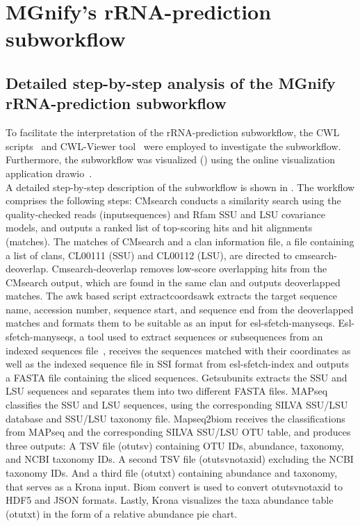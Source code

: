 \section{MGnify's rRNA-prediction subworkflow}\label{sec:Ported-version-of-MGnify}

\subsection{Detailed step-by-step analysis of the MGnify rRNA-prediction subworkflow}\label{subsec:Interpretation}
To facilitate the interpretation of the rRNA-prediction subworkflow, the CWL scripts~\cite{noauthor_pipeline-v5_2023} and CWL-Viewer tool~\cite{noauthor_common_nodate} were employed to investigate the subworkflow. Furthermore, the subworkflow was visualized () using the online visualization application drawio~\cite{noauthor_jgraphdrawio_nodate}.\\
A detailed step-by-step description of the subworkflow is shown in . The workflow comprises the following steps: CMsearch conducts a similarity search using the quality-checked reads (input\textunderscore sequences) and Rfam SSU and LSU covariance models, and outputs a ranked list of top-scoring hits and hit alignments (matches). The matches of CMsearch and a clan information file, a file containing a list of clans, CL00111 (SSU) and CL00112 (LSU), are directed to cmsearch-deoverlap. Cmsearch-deoverlap removes low-score overlapping hits from the CMsearch output, which are found in the same clan and outputs deoverlapped matches. The awk based script extract\textunderscore coords\textunderscore awk extracts the target sequence name, accession number, sequence start, and sequence end from the deoverlapped matches and formats them to be suitable as an input for esl-sfetch-manyseqs. Esl-sfetch-manyseqs, a tool used to extract sequences or subsequences from an indexed sequences file~\cite{eddy_hmmer_nodate},  receives the sequences matched with their coordinates as well as the indexed sequence file in SSI format from esl-sfetch-index and outputs a FASTA file containing the sliced sequences. Get\textunderscore subunits extracts the SSU and LSU sequences and separates them into two different FASTA files. MAPseq classifies the SSU and LSU sequences, using the corresponding SILVA SSU/LSU database and SSU/LSU taxonomy file. Mapseq2biom receives the classifications from MAPseq and the corresponding SILVA SSU/LSU OTU table, and 
produces three outputs: A TSV file (otu\textunderscore tsv) containing OTU IDs, abundance, taxonomy, and NCBI taxonomy IDs. A second TSV file (otu\textunderscore tsv\textunderscore notaxid) excluding the NCBI taxonomy IDs. And a third file (otu\textunderscore txt) containing abundance and taxonomy, that serves as a Krona input. Biom convert is used to convert otu\textunderscore tsv\textunderscore notaxid to HDF5 and JSON formats. Lastly, Krona visualizes the taxa abundance table  (otu\textunderscore txt) in the form of a relative abundance pie chart.

